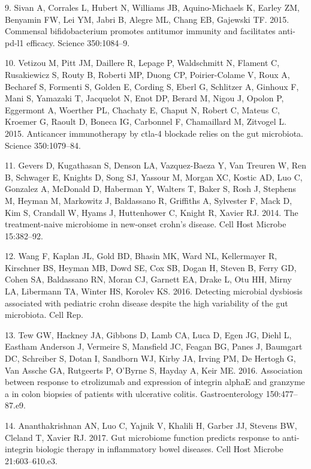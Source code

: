 \documentclass[12pt,]{article}
\begin{document}
\hypertarget{ref-Sivan_cancer_2015}{}
9. Sivan A, Corrales L, Hubert N, Williams JB, Aquino-Michaels K, Earley
ZM, Benyamin FW, Lei YM, Jabri B, Alegre ML, Chang EB, Gajewski TF.
2015. Commensal bifidobacterium promotes antitumor immunity and
facilitates anti-pd-l1 efficacy. Science 350:1084--9.

\hypertarget{ref-Vetizou_cancer_2015}{}
10. Vetizou M, Pitt JM, Daillere R, Lepage P, Waldschmitt N, Flament C,
Rusakiewicz S, Routy B, Roberti MP, Duong CP, Poirier-Colame V, Roux A,
Becharef S, Formenti S, Golden E, Cording S, Eberl G, Schlitzer A,
Ginhoux F, Mani S, Yamazaki T, Jacquelot N, Enot DP, Berard M, Nigou J,
Opolon P, Eggermont A, Woerther PL, Chachaty E, Chaput N, Robert C,
Mateus C, Kroemer G, Raoult D, Boneca IG, Carbonnel F, Chamaillard M,
Zitvogel L. 2015. Anticancer immunotherapy by ctla-4 blockade relies on
the gut microbiota. Science 350:1079--84.

\hypertarget{ref-gevers_pedsCD_2014}{}
11. Gevers D, Kugathasan S, Denson LA, Vazquez-Baeza Y, Van Treuren W,
Ren B, Schwager E, Knights D, Song SJ, Yassour M, Morgan XC, Kostic AD,
Luo C, Gonzalez A, McDonald D, Haberman Y, Walters T, Baker S, Rosh J,
Stephens M, Heyman M, Markowitz J, Baldassano R, Griffiths A, Sylvester
F, Mack D, Kim S, Crandall W, Hyams J, Huttenhower C, Knight R, Xavier
RJ. 2014. The treatment-naive microbiome in new-onset crohn's disease.
Cell Host Microbe 15:382--92.

\hypertarget{ref-wang_pedsCD_2016}{}
12. Wang F, Kaplan JL, Gold BD, Bhasin MK, Ward NL, Kellermayer R,
Kirschner BS, Heyman MB, Dowd SE, Cox SB, Dogan H, Steven B, Ferry GD,
Cohen SA, Baldassano RN, Moran CJ, Garnett EA, Drake L, Otu HH, Mirny
LA, Libermann TA, Winter HS, Korolev KS. 2016. Detecting microbial
dysbiosis associated with pediatric crohn disease despite the high
variability of the gut microbiota. Cell Rep.

\hypertarget{ref-Tew2016_UC}{}
13. Tew GW, Hackney JA, Gibbons D, Lamb CA, Luca D, Egen JG, Diehl L,
Eastham Anderson J, Vermeire S, Mansfield JC, Feagan BG, Panes J,
Baumgart DC, Schreiber S, Dotan I, Sandborn WJ, Kirby JA, Irving PM, De
Hertogh G, Van Assche GA, Rutgeerts P, O'Byrne S, Hayday A, Keir ME.
2016. Association between response to etrolizumab and expression of
integrin alphaE and granzyme a in colon biopsies of patients with
ulcerative colitis. Gastroenterology 150:477--87.e9.

\hypertarget{ref-Ananthakrishnan_IBD_2017}{}
14. Ananthakrishnan AN, Luo C, Yajnik V, Khalili H, Garber JJ, Stevens
BW, Cleland T, Xavier RJ. 2017. Gut microbiome function predicts
response to anti-integrin biologic therapy in inflammatory bowel
diseases. Cell Host Microbe 21:603--610.e3.
\end{document}
